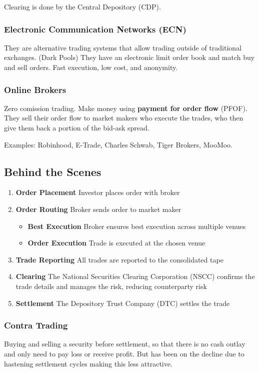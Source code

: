 Clearing is done by the Central Depository (CDP).

\subsubsection{Electronic Communication Networks (ECN)}
They are alternative trading systems that allow trading outside of traditional exchanges. (Dark Pools)
They have an electronic limit order book and match buy and sell orders.
Fast execution, low cost, and anonymity.

\subsubsection{Online Brokers}
Zero comission trading.
Make money using \textbf{payment for order flow} (PFOF).
They sell their order flow to market makers who execute the trades, who then give them back a portion of the bid-ask spread.

Examples: Robinhood, E-Trade, Charles Schwab, Tiger Brokers, MooMoo.

\subsection{Behind the Scenes}
	\begin{enumerate}
		\item \textbf{Order Placement} Investor places order with broker
		\item \textbf{Order Routing} Broker sends order to market maker
			\begin{itemize}
			\item \textbf{Best Execution} Broker ensures best execution across multiple venues
		\item \textbf{Order Execution} Trade is executed at the chosen venue
			
			\end{itemize}
		\item \textbf{Trade Reporting} All trades are reported to the consolidated tape
		\item \textbf{Clearing} The National Securities Clearing Corporation (NSCC) confirms the trade details and manages the risk, reducing counterparty risk
		\item \textbf{Settlement} The Depository Trust Company (DTC) settles the trade
	\end{enumerate}

\subsubsection{Contra Trading}
Buying and selling a security before settlement, so that there is no cash outlay and only need to pay loss or receive profit. But has been on the decline due to hastening settlement cycles making this less attractive.

